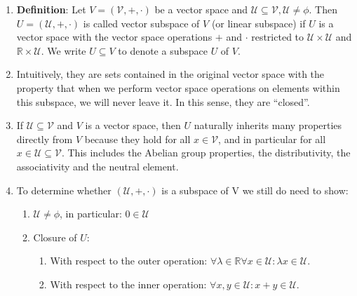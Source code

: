 \begin{enumerate}
    \item \textbf{Definition}: Let $V = (\mathcal{V}, +, \cdot )$ be a vector space and $\mathcal{U} \subseteq \mathcal{V}, \mathcal{U} \neq \phi$. Then $U = (\mathcal{U}, +, \cdot )$ is called vector subspace of $V$ (or linear subspace) if $U$ is a vector space with the vector space operations $+$ and $\cdot$  restricted to $\mathcal{U} \times \mathcal{U}$ and $\mathbb{R} \times \mathcal{U}$. We write $U \subseteq V$ to denote a subspace $U$ of $V$.
    \hfill \cite{mfml/book/mml/Deisenroth-Faisal-Ong}

    \item Intuitively, they are sets contained in the original vector space with the property that when we perform vector space operations on elements within this subspace, we will never leave it. 
    In this sense, they are “closed”.
    \hfill \cite{mfml/book/mml/Deisenroth-Faisal-Ong}

    \item If $\mathcal{U} \subseteq \mathcal{V}$ and $V$ is a vector space, then $U$ naturally inherits many properties directly from $V$ because they hold for all $x \in \mathcal{V}$, and in particular for all $x \in \mathcal{U} \subseteq \mathcal{V}$. 
    This includes the Abelian group properties, the distributivity, the associativity and the neutral element.
    \hfill \cite{mfml/book/mml/Deisenroth-Faisal-Ong}

    \item To determine whether $(\mathcal{U}, +, \cdot)$ is a subspace of V we still do need to show:
    \begin{enumerate}
        \item $\mathcal{U} \neq \phi$, in particular: $0 \in \mathcal{U}$
        \item Closure of $U$:
        \begin{enumerate}
            \item With respect to the outer operation: $\forall \lambda  \in  \mathbb{R} \forall x \in  \mathcal{U} : \lambda x \in  \mathcal{U}$.
            \item With respect to the inner operation: $\forall x, y \in  \mathcal{U} : x + y \in  \mathcal{U}$.
        \end{enumerate}
    \end{enumerate}
\end{enumerate}











